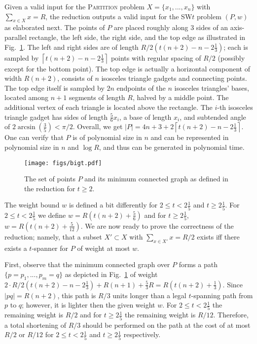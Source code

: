 \documentclass[a4paper]{llncs}
\newcommand{\smallt}{$2 \leq t <2 \frac{1}{5}$}
\newcommand{\bigt}{$t \geq 2 \frac{1}{5}$}
\begin{document}
Given a valid input for the \textsc{Partition} problem $X=\{x_1,...,x_n\}$ with $\sum_{x \in X}x = R$,
the reduction outputs a valid input for the SW$t$ problem $(P,w)$ as elaborated next.
The points of $P$ are placed roughly along 3 sides of an axis-parallel rectangle,
the left side, the right side, and the top edge as illustrated in Fig.~\ref{fig:bigt}. 
The left and right sides are of length $R/2(t(n+2)-n-2\frac{1}{3})$; 
each is sampled by $\left\lceil{t(n+2)-n-2\frac{1}{3}}\right\rceil$ points
with regular spacing of $R/2$ (possibly except for the bottom point).
The top edge is actually a horizontal component of width $R(n+2)$, 
consists of $n$ isosceles triangle gadgets and connecting points.
The top edge itself is sampled by $2n$ endpoints of the $n$ isosceles triangles' bases, 
located among $n+1$ segments of length $R$,
halved by a middle point. The additional vertex of each triangle is located above the rectangle.
The $i$-th isosceles triangle gadget has sides of length $\frac{5}{6}x_i$,
a base of length $x_i$, and subtended angle of $2\arcsin(\frac{3}{5}) < \pi/2$.
Overall, we get $|P|=4n+3+2 \left\lceil{t(n+2)-n-2\frac{1}{3}}\right\rceil$.
One can verify that $P$ is of polynomial size in $n$ and can be represented in 
polynomial size in $n$ and $\log R$, and thus can be generated in polynomial time.
\begin{figure}[htb]
    \centering
        \texttt{[image: figs/bigt.pdf]}
    \caption{The set of points $P$ and its minimum connected graph as defined in the reduction for $t\geq2$.}
    \label{fig:bigt}
\end{figure}


The weight bound $w$ is defined a bit differently for \smallt{} and \bigt{}.
For \smallt{} we define $w=R(t(n+2)+\frac{5}{6})$
and for  \bigt{}, $w=R(t(n+2)+\frac{5}{12})$.
We are now ready to prove the correctness of the reduction; namely, 
that a subset $X'\subset X$ with $\sum_{x \in X'} x =R/2$ exists 
iff there exists a $t$-spanner for $P$ of weight at most $w$.

First, observe that the minimum connected graph over $P$ forms a path
$\{p=p_1,...,p_m=q\}$ as depicted in Fig.~\ref{fig:bigt}
of weight $2\cdot R/2(t(n+2)-n-2\frac{1}{3}) + R(n+1) + \frac{5}{3}R= R(t(n+2)+\frac{1}{3})$.
Since $|pq|=R(n+2)$, this path is $R/3$ units longer than a legal
$t$-spanning path from $p$ to $q$;
however, it is lighter then the given weight $w$.
For \smallt{} the remaining weight is $R/2$
and for \bigt{} the remaining weight is $R/12$.
Therefore, a total shortening of $R/3$ should be performed on the path
at the cost of at most $R/2$ or $R/12$ for \smallt{} and \bigt{} respectively.
\end{document}
